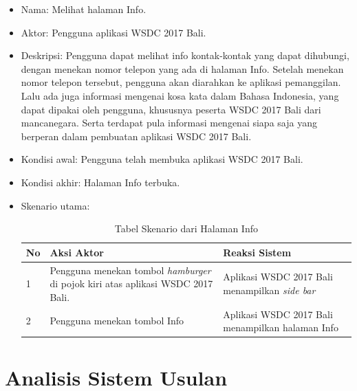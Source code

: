 \begin{enumerate}
	\begin{itemize}
		\item Nama: Melihat halaman Info.
		\item Aktor: Pengguna aplikasi WSDC 2017 Bali.
		\item Deskripsi: Pengguna dapat melihat info kontak-kontak yang dapat dihubungi, dengan menekan nomor telepon yang ada di halaman Info. Setelah menekan nomor telepon tersebut, pengguna akan diarahkan ke aplikasi pemanggilan. Lalu ada juga informasi mengenai kosa kata dalam Bahasa Indonesia, yang dapat dipakai oleh pengguna, khususnya peserta WSDC 2017 Bali dari mancanegara. Serta terdapat pula informasi mengenai siapa saja yang berperan dalam pembuatan aplikasi WSDC 2017 Bali.
		\item Kondisi awal: Pengguna telah membuka aplikasi WSDC 2017 Bali.
		\item Kondisi akhir: Halaman Info terbuka.
		\item Skenario utama: \\
		\begin{table}[H]
			\centering
			\begin{tabular}{|p{0.5cm}|p{7cm}|p{7cm}|}
				\hline
				No & Aksi Aktor                               & Reaksi Sistem                                          \\ \hline
				1  & Pengguna menekan tombol {\it hamburger} di pojok kiri atas aplikasi WSDC 2017 Bali. & Aplikasi WSDC 2017 Bali menampilkan {\it side bar} \\ \hline
				2  & Pengguna menekan tombol Info & Aplikasi WSDC 2017 Bali menampilkan halaman Info \\ \hline
			\end{tabular}
			\caption{Tabel Skenario dari Halaman Info}
			\label{table:skenarioHalamanInfo}
		\end{table}
	\end{itemize}
\end{enumerate}

\section{Analisis Sistem Usulan}
\label{sec:analisisSistemUsulan}